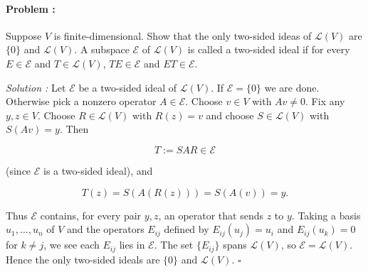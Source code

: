 \paragraph{Problem :} Suppose $V$ is finite-dimensional. Show that the only two-sided ideas of $\mathcal{L}(V)$ are $\{0\}$ and 
$\mathcal{L}(V)$. A subspace $\mathcal{E}$ of $\mathcal{L}(V)$ is called a two-sided ideal if for every $E \in \mathcal{E}$ and 
$T \in \mathcal{L}(V)$, $TE \in \mathcal{E}$ and $ET \in \mathcal{E}$.

\vspace{4mm} 
\textit{Solution :} 
Let $\mathcal E$ be a two-sided ideal of $\mathcal L(V)$. If $\mathcal E=\{0\}$ we are done. Otherwise pick a nonzero operator $A\in\mathcal E$.
Choose $v\in V$ with $Av\neq0$. Fix any $y,z\in V$. Choose $R\in\mathcal L(V)$ with $R(z)=v$ and choose $S\in\mathcal L(V)$ with $S(Av)=y$. 
Then

$$
T:=S A R\in\mathcal E
$$

(since $\mathcal E$ is a two-sided ideal), and

$$
T(z)=S(A(R(z)))=S(A(v))=y.
$$

Thus $\mathcal E$ contains, for every pair $y,z$, an operator that sends $z$ to $y$. Taking a basis $u_1,\dots,u_n$ of $V$ and the operators
$E_{ij}$ defined by $E_{ij}(u_j)=u_i$ and $E_{ij}(u_k)=0$ for $k\ne j$, we see each $E_{ij}$ lies in $\mathcal E$. The set $\{E_{ij}\}$ 
spans $\mathcal L(V)$, so $\mathcal E=\mathcal L(V)$. Hence the only two-sided ideals are $\{0\}$ and $\mathcal L(V)$. $\square$